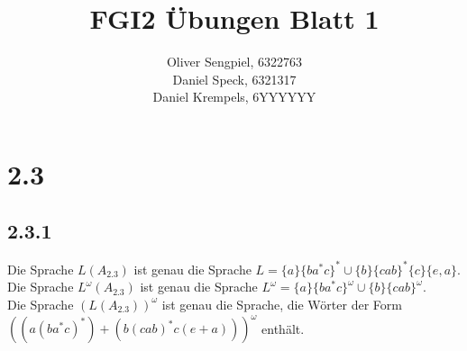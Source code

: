 \documentclass{article}
\title{FGI2 Übungen Blatt 1}
\author{Oliver Sengpiel, 6322763 \\ Daniel Speck, 6321317 \\ Daniel
Krempels, 6YYYYYY}
\begin{document}
\maketitle

\section*{2.3}
\subsection*{2.3.1}
Die Sprache $L(A_{2.3})$ ist genau die Sprache $L = \{ a\} \{ba^*c\}^* \cup
\{ b\} \{cab\}^* \{c\} \{e , a\}$. \\
Die Sprache $L^\omega(A_{2.3})$ ist genau die Sprache $L^\omega = \{a \} 
\{ba^*c\}^\omega \cup \{ b \}\{cab\}^\omega $. \\
Die Sprache $(L(A_{2.3}))^\omega$ ist genau die Sprache, die Wörter der Form
$((a (ba^*c)^*) + (b (cab)^* c (e + a)))^\omega$ enthält.
\end{document}
